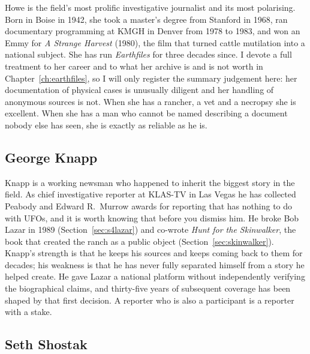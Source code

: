 Howe is the field's most prolific investigative journalist and its
most polarising. Born in Boise in 1942, she took a master's degree from Stanford in 1968,
ran documentary programming at KMGH in Denver from 1978 to 1983, and won an Emmy for
\emph{A Strange Harvest} (1980), the film that turned cattle mutilation into a national
subject. She has run \emph{Earthfiles} for three decades since. I devote a full treatment
to her career and to what her archive is and is not worth in
Chapter~\ref{ch:earthfiles}, so I will only register the summary judgement here: her
documentation of physical cases is unusually diligent and her handling of anonymous
sources is not. When she has a rancher, a vet and a necropsy she is excellent. When she has
a man who cannot be named describing a document nobody else has seen, she is exactly as
reliable as he is.

\subsection{George Knapp}

Knapp is a working newsman who happened to inherit the biggest story in
the field. As chief investigative reporter at KLAS-TV in Las Vegas he has collected
Peabody and Edward R.~Murrow awards for reporting that has nothing to do with UFOs, and it
is worth knowing that before you dismiss him. He broke Bob Lazar in 1989
(Section~\ref{sec:s4lazar}) and co-wrote \emph{Hunt for the Skinwalker}, the book that
created the ranch as a public object (Section~\ref{sec:skinwalker}). Knapp's strength is
that he keeps his sources and keeps coming back to them for decades; his weakness is that
he has never fully separated himself from a story he helped create. He gave Lazar a
national platform without independently verifying the biographical claims, and thirty-five
years of subsequent coverage has been shaped by that first decision. A reporter who is
also a participant is a reporter with a stake.

\subsection{Seth Shostak}


